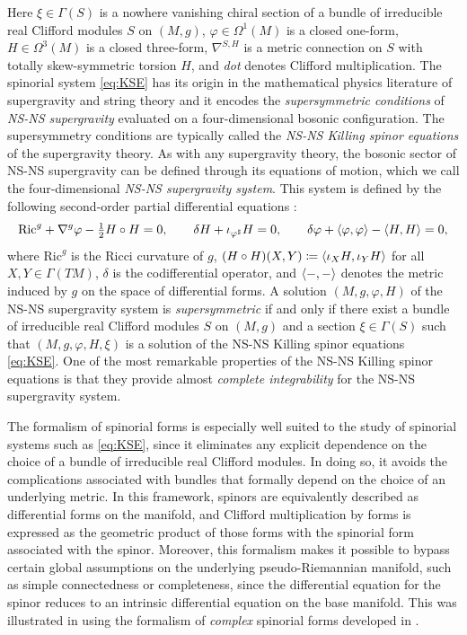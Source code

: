 \documentclass[10pt,reqno]{amsart}
\theoremstyle{definition}
\theoremstyle{remark}
\DeclarePairedDelimiter{\escal}{\langle}{\rangle}
\begin{document}
Here $\xi\in\Gamma(S)$ is a nowhere vanishing chiral section of a bundle of irreducible real Clifford modules $S$ on $(M,g)$, $\varphi\in\Omega^1(M)$ is a closed one-form, $H\in\Omega^3(M)$ is a closed three-form, $\nabla^{S,H}$ is a metric connection on $S$ with totally skew-symmetric torsion $H$, and \emph{dot} denotes Clifford multiplication. The spinorial system \eqref{eq:KSE} has its origin in the mathematical physics literature of supergravity and string theory \cite{Freedman_Proeyen2012,Becker_Schwarz2012,Ortin2015,Tomasiello2022} and it encodes the \emph{supersymmetric conditions} of \emph{NS-NS supergravity} evaluated on a four-dimensional bosonic configuration. The supersymmetry conditions are typically called the \emph{NS-NS Killing spinor equations} of the supergravity theory. As with any supergravity theory, the bosonic sector of NS-NS supergravity can be defined through its equations of motion, which we call the four-dimensional \emph{NS-NS supergravity system}. This system is defined by the following second-order partial differential equations \cite{Cortes_Lazaroiu_Shahbazi2021,ShahbaziThesis}: \begin{equation*}
    \mathrm{Ric}^g+\nabla^g\varphi-\tfrac{1}{2}H\circ H=0,\qquad\delta H+\iota_{\varphi^{\sharp}}H=0,\qquad\delta\varphi+\escal{\varphi,\varphi}-\escal{H,H}=0,
\end{equation*} where $\mathrm{Ric}^g$ is the Ricci curvature of $g$, $(H\circ H)(X,Y)\coloneqq\escal{\iota_XH,\iota_YH}$ for all $X,Y\in\Gamma(TM)$, $\delta$ is the codifferential operator, and $\escal{-,-}$ denotes the metric induced by $g$ on the space of differential forms. A solution $(M,g,\varphi,H)$ of the NS-NS supergravity system is \emph{supersymmetric} if and only if there exist a bundle of irreducible real Clifford modules $S$ on $(M,g)$ and a section $\xi\in\Gamma(S)$ such that $(M,g,\varphi,H,\xi)$ is a solution of the NS-NS Killing spinor equations \eqref{eq:KSE}. One of the most remarkable properties of the NS-NS Killing spinor equations is that they provide almost \emph{complete integrability} for the NS-NS supergravity system.\medskip

The formalism of spinorial forms is especially well suited to the study of spinorial systems such as \eqref{eq:KSE}, since it eliminates any explicit dependence on the choice of a bundle of irreducible real Clifford modules. In doing so, it avoids the complications associated with bundles that formally depend on the choice of an underlying metric. In this framework, spinors are equivalently described as differential forms on the manifold, and Clifford multiplication by forms is expressed as the geometric product of those forms with the spinorial form associated with the spinor. Moreover, this formalism makes it possible to bypass certain global assumptions on the underlying pseudo-Riemannian manifold, such as simple connectedness or completeness, since the differential equation for the spinor reduces to an intrinsic differential equation on the base manifold. This was illustrated in \cite{GS26_Sasakian} using the formalism of \emph{complex} spinorial forms developed in \cite{Gil-Garcia_Shahbazi2025,Gil-Garcia_Shahbazi2026}.\medskip
\end{document}
